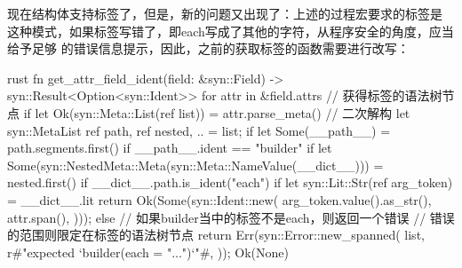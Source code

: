 现在结构体支持标签了，但是，新的问题又出现了：上述的过程宏要求的标签是
这种模式，如果标签写错了，即each写成了其他的字符，从程序安全的角度，应当给予足够
的错误信息提示，因此，之前的获取标签的函数需要进行改写：
\begin{code-block}{rust}
fn get_attr_field_ident(field: &syn::Field) -> syn::Result<Option<syn::Ident>> {
    for attr in &field.attrs {
        // 获得标签的语法树节点
        if let Ok(syn::Meta::List(ref list)) = attr.parse_meta() {
            // 二次解构
            let syn::MetaList {
                ref path,
                ref nested,
                ..
            } = list;
            if let Some(__path__) = path.segments.first() {
                if __path__.ident == "builder" {
                    if let Some(syn::NestedMeta::Meta(syn::Meta::NameValue(__dict__))) =
                        nested.first()
                    {
                        if __dict__.path.is_ident("each") {
                            if let syn::Lit::Str(ref arg_token) = __dict__.lit {
                                return Ok(Some(syn::Ident::new(
                                    arg_token.value().as_str(),
                                    attr.span(),
                                )));
                            }
                        } else {
                            // 如果builder当中的标签不是each，则返回一个错误
                            // 错误的范围则限定在标签的语法树节点
                            return Err(syn::Error::new_spanned(
                                list,
                                r#"expected `builder(each = "...")`"#,
                            ));
                        }
                    }
                }
            }
        }
    }
    Ok(None)
}
\end{code-block}

